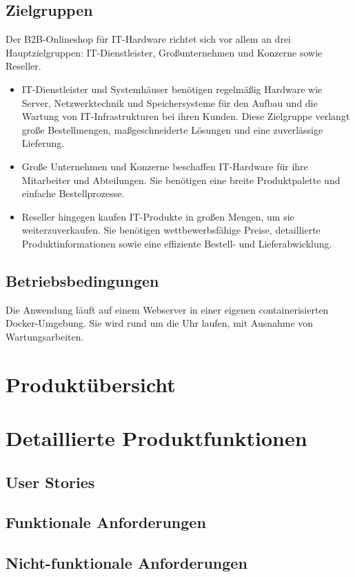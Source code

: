 \documentclass[%
	ngerman,
	12pt,
	a4paper
]{scrbook}
\begin{document}
\section{Zielgruppen}
Der B2B-Onlineshop für IT-Hardware richtet sich vor allem an drei Hauptzielgruppen:
IT-Dienstleister, Großunternehmen und Konzerne sowie Reseller.
\begin{itemize}
	\item IT-Dienstleister und Systemhäuser benötigen regelmäßig Hardware wie Server, Netzwerktechnik und Speichersysteme für den Aufbau und die Wartung von IT-Infrastrukturen bei ihren Kunden.
	Diese Zielgruppe verlangt große Bestellmengen, maßgeschneiderte Lösungen und eine zuverlässige Lieferung.
	\item Große Unternehmen und Konzerne beschaffen IT-Hardware für ihre Mitarbeiter und Abteilungen.
	Sie benötigen eine breite Produktpalette und einfache Bestellprozesse.
	\item Reseller hingegen kaufen IT-Produkte in großen Mengen, um sie weiterzuverkaufen.
	Sie benötigen wettbewerbsfähige Preise, detaillierte Produktinformationen sowie eine effiziente Bestell- und Lieferabwicklung.
\end{itemize}
\section{Betriebsbedingungen}
Die Anwendung läuft auf einem Webserver in einer eigenen containerisierten Docker-Umgebung.
Sie wird rund um die Uhr laufen, mit Ausnahme von Wartungsarbeiten.

\chapter{Produktübersicht}

\chapter{Detaillierte Produktfunktionen}
\section{User Stories}
\section{Funktionale Anforderungen}
\section{Nicht-funktionale Anforderungen}
\end{document}
